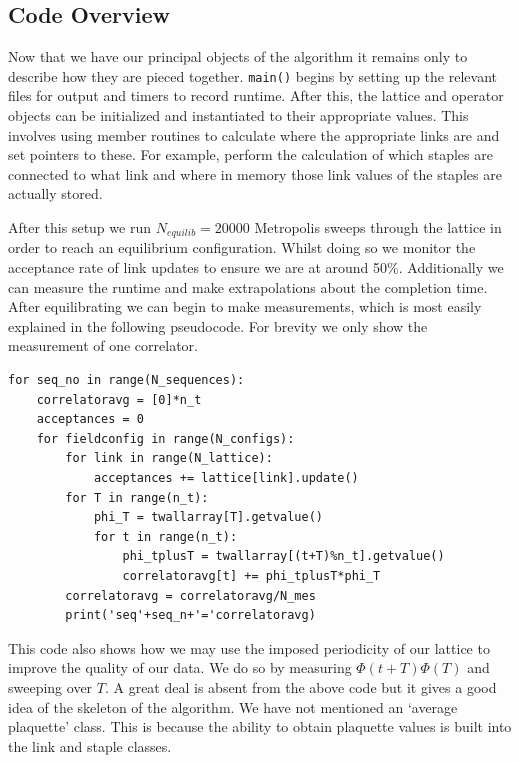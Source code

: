 \documentclass[12pt]{article}
\begin{document}
\subsection{Code Overview}
Now that we have our principal objects of the algorithm it remains only to describe how they are pieced together. \texttt{main()} begins by setting up the relevant files for output and timers to record runtime. After this, the lattice and operator objects can be initialized and instantiated to their appropriate values. This involves using member routines to calculate where the appropriate links are and set pointers to these. For example, perform the calculation of which staples are connected to what link and where in memory those link values of the staples are actually stored.

\par After this setup we run $N_{equilib} = 20000$ Metropolis sweeps through the lattice in order to reach an equilibrium configuration. Whilst doing so we monitor the acceptance rate of link updates to ensure we are at around 50\%. Additionally we can measure the runtime and make extrapolations about the completion time. After equilibrating we can begin to make measurements, which is most easily explained in the following pseudocode. For brevity we only show the measurement of one correlator.

\begin{verbatim}
for seq_no in range(N_sequences):
    correlatoravg = [0]*n_t
    acceptances = 0
    for fieldconfig in range(N_configs):
        for link in range(N_lattice):
            acceptances += lattice[link].update()
        for T in range(n_t):
            phi_T = twallarray[T].getvalue()
            for t in range(n_t):
                phi_tplusT = twallarray[(t+T)%n_t].getvalue()
                correlatoravg[t] += phi_tplusT*phi_T
        correlatoravg = correlatoravg/N_mes
        print('seq'+seq_n+'='correlatoravg)
\end{verbatim}
This code also shows how we may use the imposed periodicity of our lattice to improve the quality of our data. We do so by measuring $\Phi(t+T)\Phi(T)$ and sweeping over $T$. A great deal is absent from the above code but it gives a good idea of the skeleton of the algorithm. We have not mentioned an `average plaquette' class. This is because the ability to obtain plaquette values is built into the link and staple classes.
\end{document}
